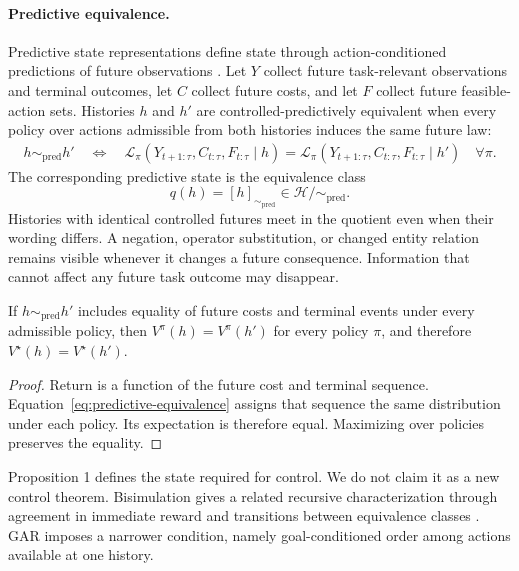\paragraph{Predictive equivalence.}
Predictive state representations define state through action-conditioned predictions of future observations \citep{littman2001predictive}. Let $Y$ collect future task-relevant observations and terminal outcomes, let $C$ collect future costs, and let $F$ collect future feasible-action sets. Histories $h$ and $h'$ are controlled-predictively equivalent when every policy over actions admissible from both histories induces the same future law:
\begin{align}
h \sim_{\mathrm{pred}} h'
\quad\Longleftrightarrow\quad
\mathcal{L}_{\pi}(Y_{t+1:\tau},C_{t:\tau},F_{t:\tau}\mid h)
=
\mathcal{L}_{\pi}(Y_{t+1:\tau},C_{t:\tau},F_{t:\tau}\mid h')
\quad\forall\pi.
\label{eq:predictive-equivalence}
\end{align}
The corresponding predictive state is the equivalence class
\begin{equation}
    q(h)=[h]_{\sim_{\mathrm{pred}}}\in\mathcal{H}/{\sim_{\mathrm{pred}}}.
\end{equation}
Histories with identical controlled futures meet in the quotient even when their wording differs. A negation, operator substitution, or changed entity relation remains visible whenever it changes a future consequence. Information that cannot affect any future task outcome may disappear.

\begin{proposition}
If $h\sim_{\mathrm{pred}}h'$ includes equality of future costs and terminal events under every admissible policy, then $V^\pi(h)=V^\pi(h')$ for every policy $\pi$, and therefore $V^\star(h)=V^\star(h')$.
\end{proposition}
\begin{proof}
Return is a function of the future cost and terminal sequence. Equation~\ref{eq:predictive-equivalence} assigns that sequence the same distribution under each policy. Its expectation is therefore equal. Maximizing over policies preserves the equality.
\end{proof}

Proposition 1 defines the state required for control. We do not claim it as a new control theorem. Bisimulation gives a related recursive characterization through agreement in immediate reward and transitions between equivalence classes \citep{ferns2011bisimulation}. GAR imposes a narrower condition, namely goal-conditioned order among actions available at one history.

